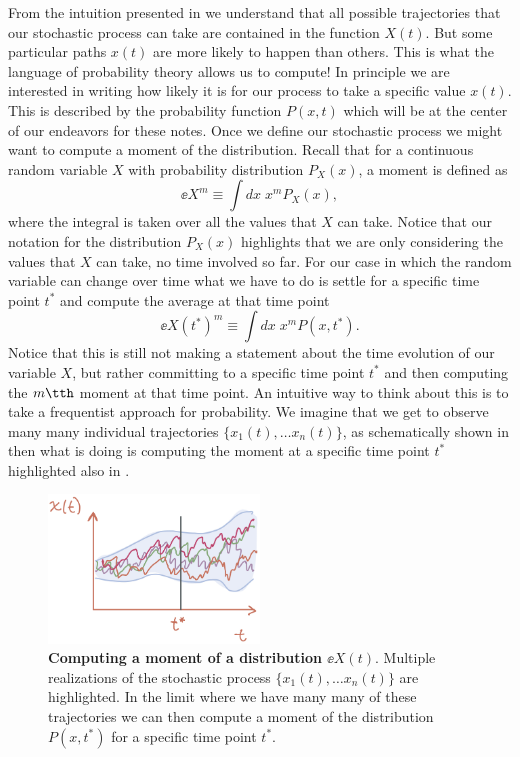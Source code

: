 From the intuition presented in  we understand that all possible
trajectories that our stochastic process can take are contained in the function
$X(t)$. But some particular paths $x(t)$ are more likely to happen than others.
This is what the language of probability theory allows us to compute! In
principle we are interested in writing how likely it is for our process to take
a specific value $x(t)$. This is described by the probability function $P(x, t)$
which will be at the center of our endeavors for these notes. Once we define our
stochastic process we might want to compute a moment of the distribution. Recall
that for a continuous random variable $X$ with probability distribution
$P_X(x)$, a moment is defined as
\begin{equation}
  \ee{X^m} \equiv \int dx \; x^m P_X(x),
\end{equation}
where the integral is taken over all the values that $X$ can take. Notice that
our notation for the distribution $P_X(x)$ highlights that we are only
considering the values that $X$ can take, no time involved so far. For our case
in which the random variable can change over time what we have to do is settle
for a specific time point $t^*$ and compute the average at that time point
\begin{equation}
  \ee{X(t^*)^m} \equiv \int dx \; x^m P(x, t^*).
  \label{eq_process_moment}
\end{equation}
Notice that this is still not making a statement about the time evolution of our
variable $X$, but rather committing to a specific time point $t^*$ and then
computing the $m\tth$ moment at that time point. An intuitive way to think about
this is to take a frequentist approach for probability. We imagine that we get
to observe many many individual trajectories $\{x_1(t), \ldots x_n(t)\}$, as
schematically shown in  then what  is
doing is computing the moment at a specific time point $t^*$ highlighted also
in .

\begin{figure}[h!]
	\centering \includegraphics[width=0.5\textwidth]
  {./fig/chapter_prob/01_00002.jpeg}
	\caption{\textbf{Computing a moment of a distribution $\ee{X(t)}$}. Multiple
  realizations of the stochastic process $\{x_1(t), \ldots x_n(t)\}$ are
  highlighted. In the limit where we have many many of these trajectories we
  can then compute a moment of the distribution $P(x, t^*)$ for a specific time
  point $t^*$. }
  \label{fig01_00002}
\end{figure}

